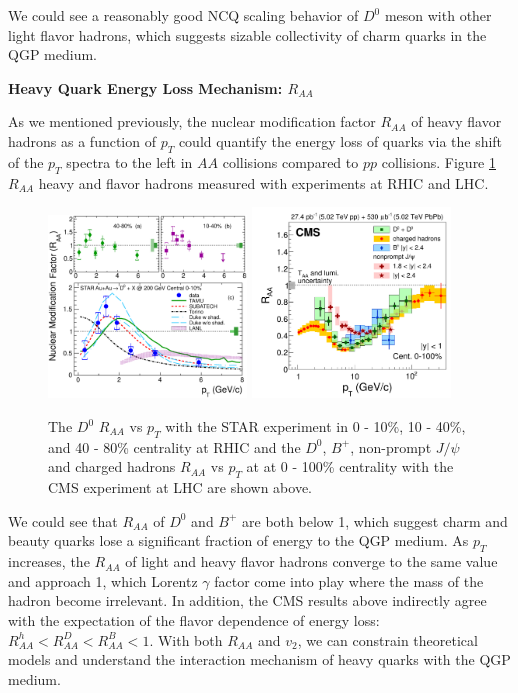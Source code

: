 We could see a reasonably good NCQ scaling behavior of $D^0$ meson with other light flavor hadrons, which suggests sizable collectivity of charm quarks in the QGP medium.

\textbf{Heavy Quark Energy Loss Mechanism: $R_{AA}$}

As we mentioned previously, the nuclear modification factor $R_{AA}$ of heavy flavor hadrons as a function of $p_T$ could quantify the energy loss of quarks via the shift of the $p_T$ spectra to the left in $AA$ collisions compared to $pp$ collisions. Figure \ref{HQRAA} $R_{AA}$ heavy and flavor hadrons measured with experiments at RHIC and LHC.

\begin{figure}[hbtp]
\begin{center}
\includegraphics[width=0.47\textwidth]{Figures/Chapter1/STARRAA.eps}
\includegraphics[width=0.47\textwidth]{Figures/Chapter1/CMSRAA.png}
\caption{The $D^0$ $R_{AA}$ vs $p_T$ with the STAR experiment in 0 - 10\%, 10 - 40\%, and 40 - 80\% centrality at RHIC and the $D^0$, $B^+$, non-prompt $J/\psi$ and charged hadrons $R_{AA}$ vs $p_T$ at at 0 - 100\% centrality with the CMS experiment at LHC are shown above.}
\label{HQRAA}
\end{center}
\end{figure}   

We could see that $R_{AA}$ of $D^0$ and $B^+$ are both below 1, which suggest charm and beauty quarks lose a significant fraction of energy to the QGP medium. As $p_T$ increases, the $R_{AA}$ of light and heavy flavor hadrons converge to the same value and approach 1, which Lorentz $\gamma$ factor come into play where the mass of the hadron become irrelevant. In addition, the CMS results above indirectly agree with the expectation of the flavor dependence of energy loss: $R_{AA}^{h} < R_{AA}^{D} < R_{AA}^{B} < 1$. With both $R_{AA}$ and $v_2$, we can constrain theoretical models and understand the interaction mechanism of heavy quarks with the QGP medium.

